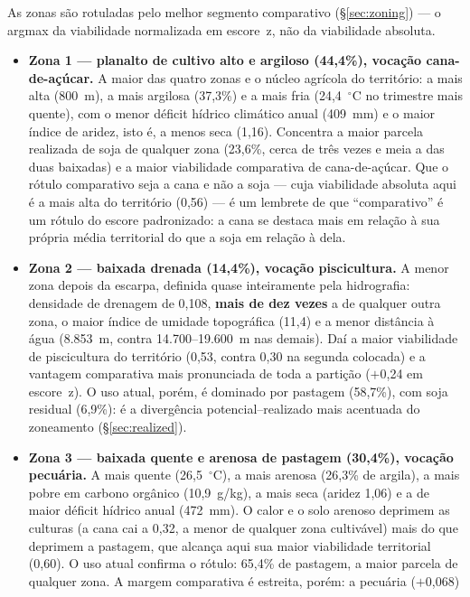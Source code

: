 As zonas são rotuladas pelo melhor segmento comparativo (\S\ref{sec:zoning}) --- o argmax da
viabilidade normalizada em escore~z, não da viabilidade absoluta.

\begin{itemize}
  \item \textbf{Zona 1 --- planalto de cultivo alto e argiloso (44,4\%), vocação
    cana-de-açúcar.} A maior das quatro zonas e o núcleo agrícola do território: a mais alta
    (800~m), a mais argilosa (37,3\%) e a mais fria (24,4~$^\circ$C no trimestre mais quente),
    com o menor déficit hídrico climático anual (409~mm) e o maior índice de aridez, isto é, a
    menos seca (1,16). Concentra a maior parcela realizada de soja de qualquer zona (23,6\%,
    cerca de três vezes e meia a das duas baixadas) e a maior viabilidade comparativa de cana-de-açúcar.
    Que o rótulo comparativo seja a cana e não a soja --- cuja viabilidade absoluta aqui é a
    mais alta do território (0,56) --- é um lembrete de que ``comparativo'' é um rótulo do
    escore padronizado: a cana se destaca mais em relação à sua própria média territorial do que a soja
    em relação à dela.
  \item \textbf{Zona 2 --- baixada drenada (14,4\%), vocação piscicultura.} A menor zona
    depois da escarpa, definida quase inteiramente pela hidrografia: densidade de drenagem de
    0,108, \textbf{mais de dez vezes} a de qualquer outra zona, o maior índice de umidade topográfica
    (11,4) e a menor distância à água (8.853~m, contra 14.700--19.600~m nas demais). Daí a maior
    viabilidade de piscicultura do território (0,53, contra 0,30 na segunda colocada) e
    a vantagem comparativa mais pronunciada de toda a partição ($+$0,24 em escore~z). O uso
    atual, porém, é dominado por pastagem (58,7\%), com soja residual (6,9\%): é a divergência
    potencial--realizado mais acentuada do zoneamento (\S\ref{sec:realized}).
  \item \textbf{Zona 3 --- baixada quente e arenosa de pastagem (30,4\%), vocação pecuária.}
    A mais quente (26,5~$^\circ$C), a mais arenosa (26,3\% de argila), a mais pobre em carbono
    orgânico (10,9~g/kg), a mais seca (aridez 1,06) e a de maior déficit hídrico anual
    (472~mm). O calor e o solo arenoso deprimem as culturas (a cana cai a 0,32, a menor de
    qualquer zona cultivável)  mais do que deprimem a pastagem, que alcança aqui sua maior
    viabilidade territorial (0,60). O uso atual confirma o rótulo: 65,4\% de pastagem, a maior
    parcela de qualquer zona. A margem comparativa é estreita, porém: a pecuária ($+$0,068)

\end{itemize}
